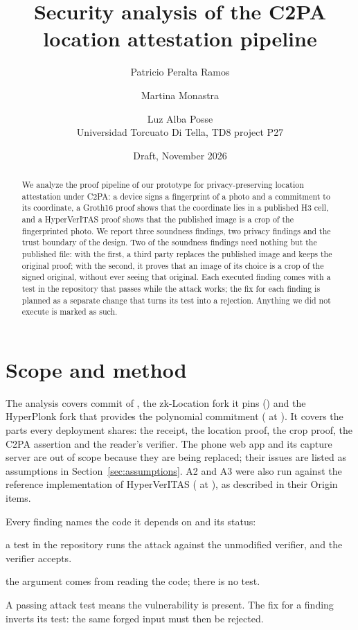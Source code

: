 \documentclass[11pt,a4paper]{article}
\title{Security analysis of the C2PA location attestation pipeline}
\author{Patricio Peralta Ramos \and Martina Monastra \and Luz Alba Posse\\[2pt]
  \small Universidad Torcuato Di Tella, TD8 project P27}
\date{Draft, November 2026}
\newcommand{\status}[1]{\textsf{\small #1}}
\begin{document}
\maketitle

\begin{abstract}
We analyze the proof pipeline of our prototype for privacy-preserving location
attestation under C2PA: a device signs a fingerprint of a photo and a
commitment to its coordinate, a Groth16 proof shows that the coordinate lies in
a published H3 cell, and a HyperVerITAS proof shows that the published image is
a crop of the fingerprinted photo. We report three soundness findings, two
privacy findings and the trust boundary of the design. Two of the soundness
findings need nothing but the published file: with the first, a third party
replaces the published image and keeps the original proof; with the second, it
proves that an image of its choice is a crop of the signed original, without
ever seeing that original. Each executed finding comes with a test in the
repository that passes while the attack works; the fix for each finding is
planned as a separate change that turns its test into a rejection. Anything we
did not execute is marked as such.
\end{abstract}

\tableofcontents

\section{Scope and method}

The analysis covers commit  of , the
zk-Location fork it pins () and the HyperPlonk fork that provides
the polynomial commitment ( at ). It
covers the parts every deployment shares: the receipt, the location proof, the
crop proof, the C2PA assertion and the reader's verifier. The phone web app and
its capture server are out of scope because they are being replaced; their
issues are listed as assumptions in Section~\ref{sec:assumptions}.
A2 and A3 were also run against the reference implementation of HyperVerITAS
( at ), as described in their
Origin items.

Every finding names the code it depends on and its status:
\begin{description}[itemsep=0pt]
  \item[\status{executed}] a test in the repository runs the attack against
    the unmodified verifier, and the verifier accepts.
  \item[\status{by inspection}] the argument comes from reading the code; there
    is no test.
\end{description}
A passing attack test means the vulnerability is present. The fix for a finding
inverts its test: the same forged input must then be rejected.
\end{document}
